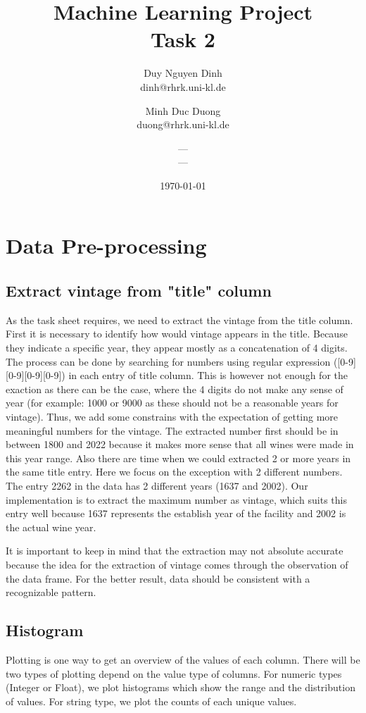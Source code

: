 \documentclass[11pt]{article}
\title{Machine Learning Project\\Task 2}
\author{Duy Nguyen Dinh \\ dinh@rhrk.uni-kl.de\and
	Minh Duc Duong\\ duong@rhrk.uni-kl.de\and
    ---\\ ---}
\date{\today}
\begin{document}
\maketitle

\section{Data Pre-processing}

\subsection{Extract vintage from "title" column}
As the task sheet requires, we need to extract the vintage from the title column. First it is necessary to identify how would vintage appears in the title. Because they indicate a specific year, they appear mostly as a concatenation of 4 digits. The process can be done by searching for numbers using regular expression ([0-9][0-9][0-9][0-9]) in each entry of title column. This is however not enough for the exaction as there can be the case, where the 4 digits do not make any sense of year (for example: 1000 or 9000 as these should not be a reasonable years for vintage). Thus, we add some constrains with the expectation of getting more meaningful numbers for the vintage. The extracted number first should be in between 1800 and 2022 because it makes more sense that all wines were made in this year range. Also there are time when we could extracted 2 or more years in the same title entry. Here we focus on the exception with 2 different numbers. The entry 2262 in the data has 2 different years (1637 and 2002). Our implementation is to extract the maximum number as vintage, which suits this entry well because 1637 represents the establish year of the facility and 2002 is the actual wine year.

It is important to keep in mind that the extraction may not absolute accurate because the idea for the extraction of vintage comes through the observation of the data frame. For the better result, data should be consistent with a recognizable pattern.

\subsection{Histogram}
Plotting is one way to get an overview of the values of each column. There will be two types of plotting depend on the value type of columns. For numeric types (Integer or Float), we plot histograms which show the range and the distribution of values. For string type, we plot the counts of each unique values.
\end{document}
